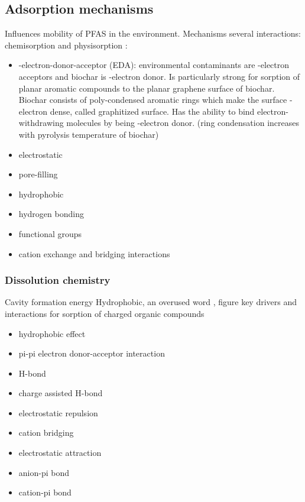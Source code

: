 \citep{Li2019} 

\subsection{Adsorption mechanisms}
Influences mobility of PFAS in the environment. 
Mechanisms
several interactions: chemisorption and physisorption \citep{Li2019}:
\begin{itemize}
    \item \textpi-\textpi electron-donor-acceptor (EDA): environmental contaminants are \textpi-electron acceptors and biochar is \textpi-electron donor. Is particularly strong for sorption of planar aromatic compounds to the planar graphene surface of biochar. Biochar consists of poly-condensed aromatic rings which make the surface \textpi-electron dense, called graphitized surface. Has the ability to bind electron-withdrawing molecules by being \textpi-electron donor. (ring condensation increases with pyrolysis temperature of biochar)
    \item electrostatic
    \item pore-filling
    \item hydrophobic
    \item hydrogen bonding
    \item functional groups
    \item cation exchange and bridging interactions
\end{itemize} 

\subsubsection{Dissolution chemistry}
Cavity formation energy
Hydrophobic, an overused word
\citep{sigmund2022sorption}, figure key drivers and interactions for sorption of charged organic compounds
\begin{itemize}
    \item hydrophobic effect
    \item pi-pi electron donor-acceptor interaction
    \item H-bond
    \item charge assisted H-bond
    \item electrostatic repulsion
    \item cation bridging
    \item electrostatic attraction
    \item anion-pi bond
    \item cation-pi bond
\end{itemize}

